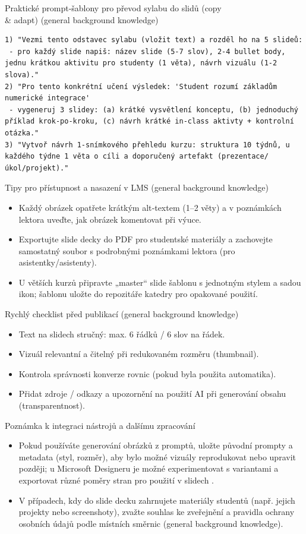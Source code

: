 \documentclass{report}%
\begin{document}
Praktické prompt‑šablony pro převod sylabu do slidů (copy \\ \& adapt)  (general background knowledge)
\begin{verbatim}
1) "Vezmi tento odstavec sylabu (vložit text) a rozděl ho na 5 slideů:
 - pro každý slide napiš: název slide (5-7 slov), 2-4 bullet body, jednu krátkou aktivitu pro studenty (1 věta), návrh vizuálu (1-2 slova)."
2) "Pro tento konkrétní učení výsledek: 'Student rozumí základům numerické integrace'
 - vygeneruj 3 slidey: (a) krátké vysvětlení konceptu, (b) jednoduchý příklad krok-po-kroku, (c) návrh krátké in-class aktivty + kontrolní otázka."
3) "Vytvoř návrh 1-snímkového přehledu kurzu: struktura 10 týdnů, u každého týdne 1 věta o cíli a doporučený artefakt (prezentace/úkol/projekt)."
\end{verbatim}

Tipy pro přístupnost a nasazení v LMS (general background knowledge)
\begin{itemize}
  \item Každý obrázek opatřete krátkým alt‑textem (1–2 věty) a v poznámkách lektora uveďte, jak obrázek komentovat při výuce.
  \item Exportujte slide decky do PDF pro studentské materiály a zachovejte samostatný soubor s podrobnými poznámkami lektora (pro asistentky/asistenty).
  \item U větších kurzů připravte „master“ slide šablonu s jednotným stylem a sadou ikon; šablonu uložte do repozitáře katedry pro opakované použití.
\end{itemize}

Rychlý checklist před publikací (general background knowledge)
\begin{itemize}
  \item Text na slidech stručný: max. 6 řádků / 6 slov na řádek.
  \item Vizuál relevantní a čitelný při redukovaném rozměru (thumbnail).
  \item Kontrola správnosti konverze rovnic (pokud byla použita automatika).
  \item Přidat zdroje / odkazy a upozornění na použití AI při generování obsahu (transparentnost).
\end{itemize}

Poznámka k integraci nástrojů a dalšímu zpracování
\begin{itemize}
  \item Pokud používáte generování obrázků z promptů, uložte původní prompty a metadata (styl, rozměr), aby bylo možné vizuály reprodukovat nebo upravit později; u Microsoft Designeru je možné experimentovat s variantami a exportovat různé poměry stran pro použití v slidech \cite{kb_ai_101_tipu_pdf_04e4a115_page_51_1}.
  \item V případech, kdy do slide decku zahrnujete materiály studentů (např. jejich projekty nebo screenshoty), zvažte souhlas ke zveřejnění a pravidla ochrany osobních údajů podle místních směrnic (general background knowledge).
\end{itemize}
\end{document}
